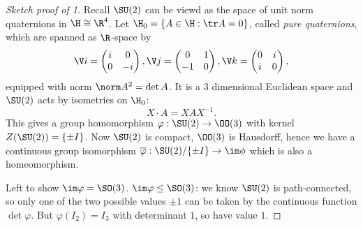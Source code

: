 \documentclass[a4paper]{article}
\theoremstyle{definition}
\begin{document}
\begin{proof}[Sketch proof of  1]
  Recall \(\SU(2)\) can be viewd as the space of unit norm quaternions in \(\H \cong \R^4\). Let \(\H_0 = \{A \in \H: \tr A = 0\}\), called \emph{pure quaternions}, which are spanned as \(\R\)-space by
  \[
    \V i =
    \begin{pmatrix}
      i & 0 \\
      0 & - i
    \end{pmatrix},
    \V j =
    \begin{pmatrix}
      0 & 1 \\
      -1 & 0
    \end{pmatrix},
    \V k =
    \begin{pmatrix}
      0 & i \\
      i & 0
    \end{pmatrix},
  \]
  equipped with norm \(\norm A^2 = \det A\). It is a 3 dimensional Euclidean space and \(\SU(2)\) acts by isometries on \(\H_0\):
  \[
    X \cdot A = XAX^{-1}.
  \]
  This gives a group homomorphism \(\varphi: \SU(2) \to \OO(3)\) with kernel \(Z(\SU(2)) = \{\pm I\}\). Now \(\SU(2)\) is compact, \(\OO(3)\) is Hausdorff, hence we have a continuous group isomorphism \(\overline \varphi: \SU(2)/\{\pm I\} \to \im \phi\) which is also a homeomorphism.

  Left to show \(\im \varphi = \SO(3)\). \(\im \varphi \leq \SO(3)\): we know \(\SU(2)\) is path-connected, so only one of the two possible values \(\pm 1\) can be taken by the continuous function \(\det \varphi\). But \(\varphi(I_2) = I_3\) with determinant \(1\), so have value \(1\).


\end{proof}
\end{document}
